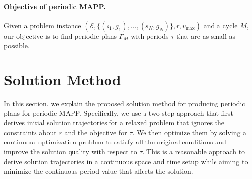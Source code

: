 \documentclass[letterpaper]{article} %
\begin{document}
\paragraph{Objective of periodic MAPP.}
Given a problem instance $(\mathcal{E}, \{(s_1,g_1),\dots,(s_N, g_N)\}, r, v_\mathrm{max})$ and a cycle $M$, our objective is to find periodic plans $\Gamma_M$ with periods $\tau$ that are as small as possible.

\section{Solution Method}\label{sec:method}

In this section, we explain the proposed solution method for producing periodic plans for periodic MAPP. Specifically, we use a two-step approach that first derives initial solution trajectories for a relaxed problem that ignores the constraints about $r$ and the objective for $\tau$. We then optimize them by solving a continuous optimization problem to satisfy all the original conditions and improve the solution quality with respect to $\tau$. This is a reasonable approach to derive solution trajectories in a continuous space and time setup while aiming to minimize the continuous period value that affects the solution.
\end{document}
